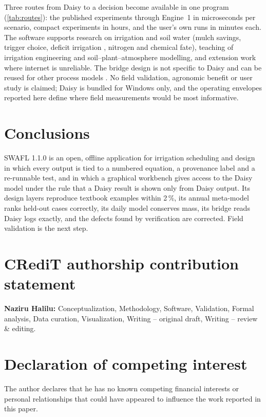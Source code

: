 \documentclass[preprint,12pt]{elsarticle}
\begin{document}
Three routes from Daisy to a decision become available in one program (\cref{tab:routes}): the published experiments through Engine~1 in microseconds per scenario, compact experiments in hours, and the user's own runs in minutes each. The software supports research on irrigation and soil water (mulch savings, trigger choice, deficit irrigation \cite{Fereres2007,Geerts2009}, nitrogen and chemical fate), teaching of irrigation engineering and soil--plant--atmosphere modelling, and extension work where internet is unreliable. The bridge design is not specific to Daisy and can be reused for other process models \cite{Simunek2016,Keating2003}. No field validation, agronomic benefit or user study is claimed; Daisy is bundled for Windows only, and the operating envelopes reported here define where field measurements would be most informative.


\section{Conclusions}
SWAFL 1.1.0 is an open, offline application for irrigation scheduling and design in which every output is tied to a numbered equation, a provenance label and a re-runnable test, and in which a graphical workbench gives access to the Daisy model under the rule that a Daisy result is shown only from Daisy output. Its design layers reproduce textbook examples within 2\,\%, its annual meta-model ranks held-out cases correctly, its daily model conserves mass, its bridge reads Daisy logs exactly, and the defects found by verification are corrected. Field validation is the next step.

\section*{CRediT authorship contribution statement}
\textbf{Naziru Halilu:} Conceptualization, Methodology, Software, Validation, Formal analysis, Data curation, Visualization, Writing -- original draft, Writing -- review \& editing.

\section*{Declaration of competing interest}
The author declares that he has no known competing financial interests or personal relationships that could have appeared to influence the work reported in this paper.
\end{document}
